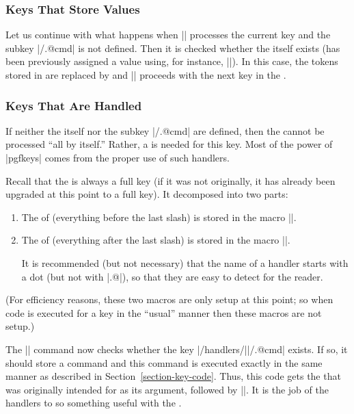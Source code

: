 \subsubsection{Keys That Store Values}

Let us continue with what happens when |\pgfkeys| processes the
current key and  the subkey |/.@cmd| is not defined. Then
it is checked whether the  itself exists (has been
previously assigned a value using, for instance,
|\pgfkeyssetvalue|). In this case, the tokens stored in  are
replaced by  and |\pgfkeys| proceeds with the next key in
the . 


\subsubsection{Keys That Are Handled}
\label{section-key-handlers}

If neither the  itself nor the subkey |/.@cmd| are
defined, then the  cannot be processed ``all by itself.''
Rather, a  is needed for this key. Most of the power of
|pgfkeys| comes from the proper use of such handlers.

Recall that the  is always a full key (if it was not
originally, it has already been upgraded at this point to a full
key). It decomposed into  two parts:

\begin{enumerate}
\item The  of  (everything
  before the last slash) is stored in the macro |\pgfkeyscurrentpath|.
\item The  of  (everything
  after the last slash) is stored in the macro |\pgfkeyscurrentname|.

  It is recommended (but not necessary) that the name of a handler
  starts with a dot (but not with |.@|), so that they are easy to
  detect for the reader.  
\end{enumerate}

(For efficiency reasons, these two macros are only setup at this point;
so when code is executed for a key in the ``usual'' manner then these
macros are not setup.)

The |\pgfkeys| command now checks whether the key
|/handlers/||/.@cmd| exists. If so, it should store a command
and this command is executed exactly in the same manner as described
in Section~\ref{section-key-code}.
Thus, this code gets the  that was originally intended for
 as its argument, followed by |\pgfeov|.
It is the job of the handlers to so something useful with the
.

